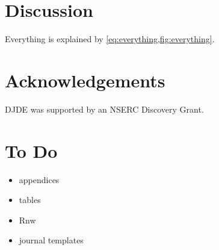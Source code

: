 \documentclass[9pt,twocolumn,twoside]{pnas/pnas_research_article/pnas-new}
\begin{document}
\section{Discussion}\label{sec:discussion}

Everything is explained by \cref{eq:everything,fig:everything}.

\section*{Acknowledgements}

DJDE was supported by an NSERC Discovery Grant.


\ifpnas
\else
  
\fi




\appendix

\section{To Do}\label{app:ToDo}

\begin{itemize}
\item appendices
\item tables
\item Rnw
\item journal templates
\end{itemize}
\end{document}
